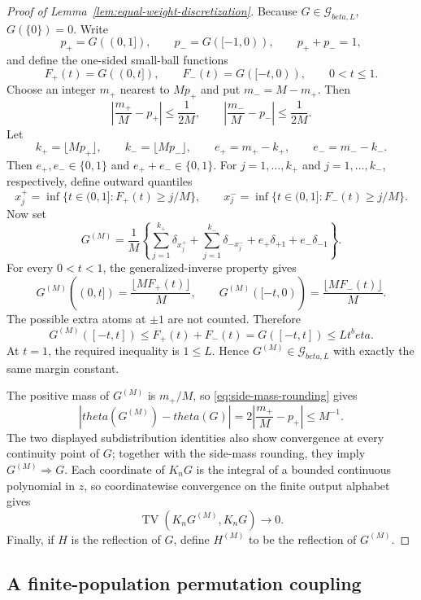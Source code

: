 \documentclass[11pt]{article}
\def\beta{beta}%
\def\theta{theta}%
\newcommand{\TV}{\operatorname{TV}}
\newcommand{\calG}{\mathcal G}
\begin{document}
\begin{proof}[Proof of Lemma~\ref{lem:equal-weight-discretization}]
Because $G\in\calG_{\beta,L}$, $G(\{0\})=0$.  Write
\[
p_+=G((0,1]),
\qquad
p_-=G([-1,0)),
\qquad
p_++p_-=1,
\]
and define the one-sided small-ball functions
\[
F_+(t)=G((0,t]),
\qquad
F_-(t)=G([-t,0)),
\qquad 0<t\le1.
\]
Choose an integer $m_+$ nearest to $Mp_+$ and put $m_-=M-m_+$.  Then
\begin{equation}
\label{eq:side-mass-rounding}
\left|\frac{m_+}{M}-p_+\right|\le\frac1{2M},
\qquad
\left|\frac{m_-}{M}-p_-\right|\le\frac1{2M}.
\end{equation}
Let
\[
k_+=\lfloor Mp_+\rfloor,
\qquad
k_-=\lfloor Mp_-\rfloor,
\qquad
e_+=m_+-k_+,
\qquad
e_-=m_--k_-.
\]
Then $e_+,e_-\in\{0,1\}$ and $e_++e_-\in\{0,1\}$.  For $j=1,\dots,k_+$ and $j=1,\dots,k_-$, respectively, define outward quantiles
\[
x_j^+
=
\inf\{t\in(0,1]:F_+(t)\ge j/M\},
\qquad
x_j^-
=
\inf\{t\in(0,1]:F_-(t)\ge j/M\}.
\]
Now set
\begin{equation}
\label{eq:outward-quantile-measure}
G^{(M)}
=
\frac1M
\left\{
\sum_{j=1}^{k_+}\delta_{x_j^+}
+
\sum_{j=1}^{k_-}\delta_{-x_j^-}
+
e_+\delta_{+1}
+
e_-\delta_{-1}
\right\}.
\end{equation}
For every $0<t<1$, the generalized-inverse property gives
\[
G^{(M)}((0,t])
=
\frac{\lfloor MF_+(t)\rfloor}{M},
\qquad
G^{(M)}([-t,0))
=
\frac{\lfloor MF_-(t)\rfloor}{M}.
\]
The possible extra atoms at $\pm1$ are not counted.  Therefore
\[
G^{(M)}([-t,t])
\le
F_+(t)+F_-(t)
=
G([-t,t])
\le
Lt^\beta.
\]
At $t=1$, the required inequality is $1\le L$.  Hence $G^{(M)}\in\calG_{\beta,L}$ with exactly the same margin constant.

The positive mass of $G^{(M)}$ is $m_+/M$, so \eqref{eq:side-mass-rounding} gives
\[
|\theta(G^{(M)})-\theta(G)|
=
2\left|\frac{m_+}{M}-p_+\right|
\le M^{-1}.
\]
The two displayed subdistribution identities also show convergence at every continuity point of $G$; together with the side-mass rounding, they imply $G^{(M)}\Rightarrow G$.  Each coordinate of $K_nG$ is the integral of a bounded continuous polynomial in $z$, so coordinatewise convergence on the finite output alphabet gives
\[
\TV(K_nG^{(M)},K_nG)\to0.
\]
Finally, if $H$ is the reflection of $G$, define $H^{(M)}$ to be the reflection of $G^{(M)}$.
\end{proof}

\subsection{A finite-population permutation coupling}
\end{document}

